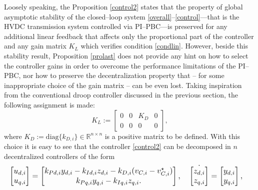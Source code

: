 \documentclass[5p,twocolumn]{elsarticle}
\numberwithin{equation}{section}
\begin{document}
Loosely speaking, the Proposition \ref{control2} states that the property of global asymptotic stability of the closed--loop system \eqref{overall}--\eqref{control}---that is the HVDC transmission system controlled via PI--PBC---is preserved for any additional linear feedback that affects only the proportional part of the controller and any gain matrix $K_L$ which verifies condition \eqref{condlin}. However, beside this stability result, Proposition \ref{prolast} does not provide any hint on how to select the controller gains in order to overcome the performance limitations of the PI--PBC, nor how to preserve the decentralization property that -- for some inappropriate choice of the gain matrix -- can be even lost. Taking inspiration from the conventional droop controller discussed in the previous section, the following assignment is made:
$$
K_L:=\begin{bmatrix}
0&0&K_D&0\\
0&0&0&0
\end{bmatrix},
$$
where $K_D:=\mathrm{diag}\{k_{D,i}\}\in\mathbb{R}^{n\times n}$ is a positive matrix to be defined. With this choice it is easy to see that the controller \eqref{control2} can be decomposed in $n$ decentralized controllers of the form
\begin{equation}\label{decpi}\resizebox{1\hsize}{!}{$
\begin{aligned}
\begin{bmatrix}
u_{d,i}\\u_{q,i}
\end{bmatrix}=\begin{bmatrix}
k_{Pd,i}y_{d,i}-k_{Id,i}z_{d,i}-k_{D,i}(v_{C,i}-v_{C,i}^\star)\\
k_{Pq,i}y_{q,i}-k_{Iq,i}z_{q,i}.
\end{bmatrix},\quad \dot{\begin{bmatrix}
z_{d,i}\\
z_{q,i}
\end{bmatrix}}&=\begin{bmatrix}
y_{d,i}\\
y_{q,i}
\end{bmatrix},
\end{aligned}$}
\end{equation}
\end{document}
